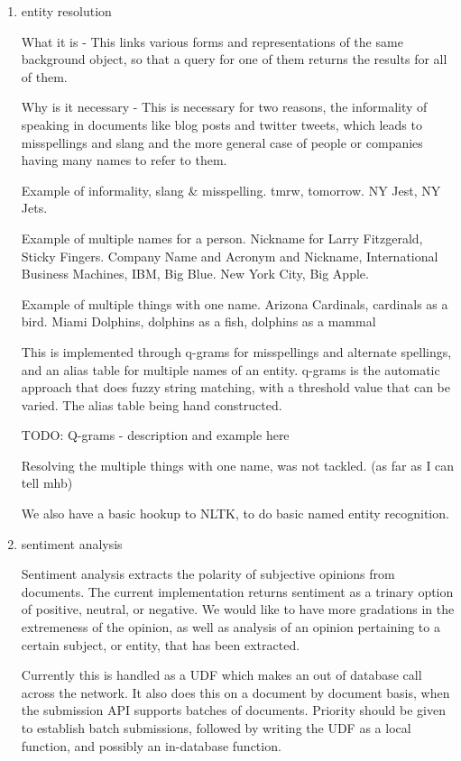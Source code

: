 \documentclass{article}
\begin{document}
\begin{enumerate}
\begin{enumerate}
  \item entity resolution

    What it is -
    This links various forms and representations of the same background object,
    so that a query for one of them returns the results for all of them.

    Why is it necessary -
    This is necessary for two reasons,
    the informality of speaking in documents like blog posts and twitter tweets,
    which leads to misspellings and slang
    and the more  general case of people or companies having many names to refer to them.

    Example of informality, slang \& misspelling. tmrw, tomorrow. NY Jest, NY Jets.

    Example of multiple names for a person.
    Nickname for Larry Fitzgerald, Sticky Fingers.
    Company Name and Acronym and Nickname, International Business Machines, IBM, Big Blue.
    New York City, Big Apple.

    Example of multiple things with one name.
    Arizona Cardinals, cardinals as a bird.
    Miami Dolphins, dolphins as a fish, dolphins as a mammal


    This is implemented through q-grams for misspellings and alternate spellings,
    and an alias table for multiple names of an entity.
    q-grams is the automatic approach that does fuzzy string matching,
    with a threshold value that can be varied.
    The alias table being hand constructed.

    TODO: Q-grams - description and example here

    Resolving the multiple things with one name, was not tackled. (as far as I can tell mhb)

    We also have a basic hookup to NLTK, to do basic named entity recognition.

  \item sentiment analysis

    Sentiment analysis extracts the polarity of subjective opinions from documents.
    The current implementation returns sentiment as a trinary option of positive, neutral, or negative.
    We would like to have more gradations in the extremeness of the opinion,
    as well as analysis of an opinion pertaining to a certain subject, or entity, that has been extracted.

    Currently this is handled as a UDF which makes an out of database call across the network.
    It also does this on a document by document basis,
    when the submission API supports batches of documents.
    Priority should be given to establish batch submissions,
    followed by writing the UDF as a local function,
    and possibly an in-database function.


\end{enumerate}
\end{enumerate}
\end{document}
